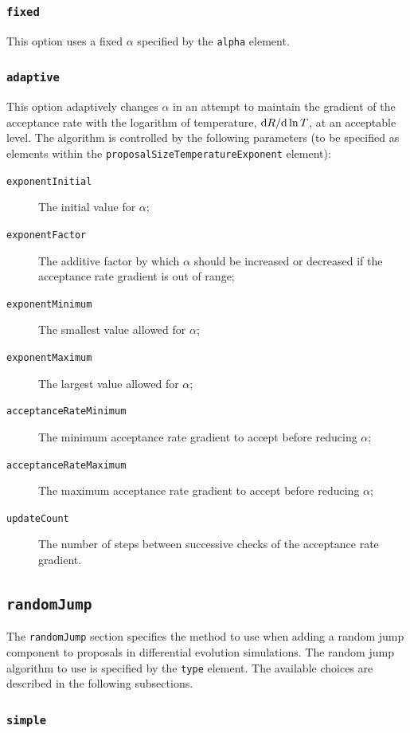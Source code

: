 \subsubsection{{\tt fixed}}

This option uses a fixed $\alpha$ specified by the {\tt alpha} element.

\subsubsection{{\tt adaptive}}

This option adaptively changes $\alpha$ in an attempt to maintain the gradient of the acceptance rate with the logarithm of temperature, ${\rm d} R/{\rm d}\ln T$, at an acceptable level. The algorithm is controlled by the following parameters (to be specified as elements within the {\tt proposalSizeTemperatureExponent} element):
\begin{description}
\item[{\tt exponentInitial}] The initial value for $\alpha$;
\item[{\tt exponentFactor}] The additive factor by which $\alpha$ should be increased or decreased if the acceptance rate gradient is out of range;
\item[{\tt exponentMinimum}] The smallest value allowed for $\alpha$;
\item[{\tt exponentMaximum}] The largest value allowed for $\alpha$;
\item[{\tt acceptanceRateMinimum}] The minimum acceptance rate gradient to accept before reducing $\alpha$;
\item[{\tt acceptanceRateMaximum}] The maximum acceptance rate gradient to accept before reducing $\alpha$;
\item[{\tt updateCount}] The number of steps between successive checks of the acceptance rate gradient.
\end{description}


\subsection{{\tt randomJump}}

The {\tt randomJump} section specifies the method to use when adding a random jump component to proposals in differential evolution simulations. The random jump algorithm to use is specified by the {\tt type} element. The available choices are described in the following subsections.

\subsubsection{{\tt simple}}

